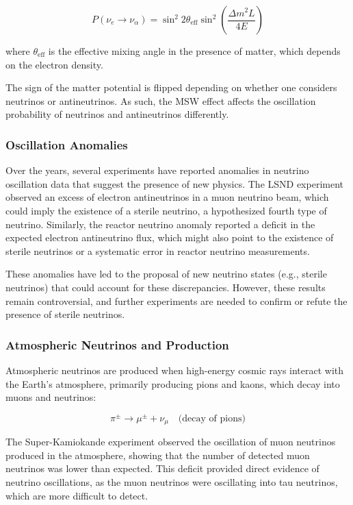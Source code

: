 \documentclass[a4paper,12pt,numbered]{article}
\begin{document}
\[
P(\nu_e \to \nu_\alpha) = \sin^2 2\theta_{\text{eff}} \sin^2 \left(\frac{\Delta m^2 L}{4E}\right)
\]

where \( \theta_{\text{eff}} \) is the effective mixing angle in the presence of matter, which depends on the electron density.

The sign of the matter potential is flipped depending on whether one considers neutrinos or antineutrinos. As such, the MSW effect affects the oscillation probability of neutrinos and antineutrinos differently.




\subsubsection{Oscillation Anomalies}
Over the years, several experiments have reported anomalies in neutrino oscillation data that suggest the presence of new physics. The LSND experiment observed an excess of electron antineutrinos in a muon neutrino beam, which could imply the existence of a sterile neutrino, a hypothesized fourth type of neutrino. Similarly, the reactor neutrino anomaly reported a deficit in the expected electron antineutrino flux, which might also point to the existence of sterile neutrinos or a systematic error in reactor neutrino measurements.

These anomalies have led to the proposal of new neutrino states (e.g., sterile neutrinos) that could account for these discrepancies. However, these results remain controversial, and further experiments are needed to confirm or refute the presence of sterile neutrinos.

\subsubsection{Atmospheric Neutrinos and Production}
Atmospheric neutrinos are produced when high-energy cosmic rays interact with the Earth's atmosphere, primarily producing pions and kaons, which decay into muons and neutrinos:

\[
\pi^\pm \to \mu^\pm + \nu_\mu \quad \text{(decay of pions)}
\]

The Super-Kamiokande experiment observed the oscillation of muon neutrinos produced in the atmosphere, showing that the number of detected muon neutrinos was lower than expected. This deficit provided direct evidence of neutrino oscillations, as the muon neutrinos were oscillating into tau neutrinos, which are more difficult to detect.
\end{document}
